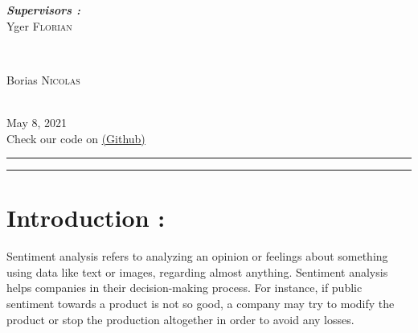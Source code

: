 \documentclass{article}
\begin{document}
\begin{titlepage}
\begin{minipage}{0.4\textwidth}
\begin{flushleft} \large
\emph{\textbf{Supervisors :}}\\
Yger \textsc{Florian} 
\end{flushleft}
\end{minipage}
~
\begin{minipage}{0.4\textwidth}
\begin{flushright} \large
Borias \textsc{Nicolas}
\end{flushright}
\end{minipage}\\[2cm]




{\large May 8, 2021}\\[2cm]
Check our code on {\href{https://github.com/ChihabEddine98/AdvancedAlgos}
{ \textcolor{secondaryColor}{(Github)} \textcolor{black}{\faGithub} }}  




\vfill 

\end{titlepage}

\renewcommand{\contentsname}{Contents}
\hspace{1.5cm}
\hrule
{
  \hypersetup{linkcolor=secondaryColor}
  \tableofcontents
}
\hspace{1.5cm}
\hrule


\newpage

\section*{Introduction :}

Sentiment analysis refers to analyzing an opinion or feelings about something using data like text or images, regarding almost anything. Sentiment analysis helps companies in their decision-making process. For instance, if public sentiment towards a product is not so good, a company may try to modify the product or stop the production altogether in order to avoid any losses.
\end{document}
